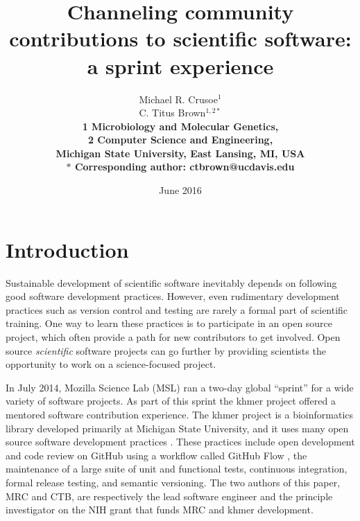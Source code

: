 \documentclass[11pt]{article}
\date{June 2016}
\title{Channeling community contributions to scientific software: a sprint experience}
\author{Michael R. Crusoe$^{1}$\\
C. Titus Brown$^{1,2\ast}$\\
\small \bf{1} Microbiology and Molecular Genetics,\\
\small \bf{2} Computer Science and Engineering,\\
\small Michigan State University, East Lansing, MI, USA\\
\small $\ast$ Corresponding author: ctbrown@ucdavis.edu}
\begin{document}
\maketitle
\thispagestyle{firststyle}


\setlength{\parindent}{0pt}
\setlength{\parindent}{0pt}
\setlength{\parskip}{0.70ex}

\section{Introduction}

Sustainable development of scientific software inevitably depends on
following good software development practices.  However, even
rudimentary development practices such as version control and testing
are rarely a formal part of scientific training.  One way to learn
these practices is to participate in an open source project, which
often provide a path for new contributors to get involved.  Open
source {\em scientific} software projects can go further by providing
scientists the opportunity to work on a science-focused project.

In July 2014, Mozilla Science Lab (MSL) ran a two-day global ``sprint'' for
a wide variety of software projects. As part of this sprint the khmer
project offered a mentored software contribution experience.  The
khmer project is a bioinformatics library developed primarily at
Michigan State University, and it uses many open source software
development practices \cite{khmer,2013-wssspe13}.  These practices
include open development and code review on GitHub using a workflow
called GitHub Flow \cite{githubflow}, the maintenance of a large suite
of unit and functional tests, continuous integration, formal release
testing, and semantic versioning.  The two authors of this paper, MRC
and CTB, are respectively the lead software engineer and the principle
investigator on the NIH grant that funds MRC and khmer development.
\end{document}
